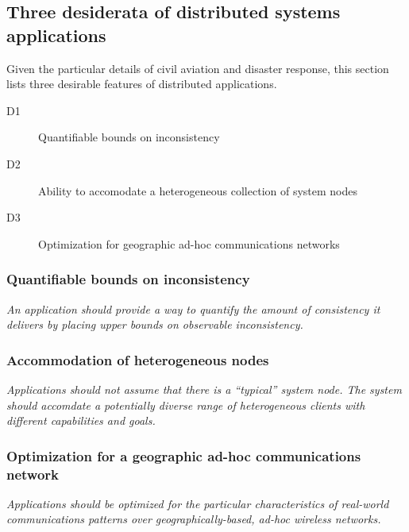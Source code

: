 \subsection{Three desiderata of distributed systems applications}

Given the particular details of civil aviation and disaster response,
this section lists three desirable features of distributed
applications.

\begin{description}
\item[D1] Quantifiable bounds on inconsistency
\item[D2] Ability to accomodate a heterogeneous collection of system nodes
\item[D3] Optimization for geographic ad-hoc communications networks
\end{description}

\subsubsection{Quantifiable bounds on inconsistency}

\emph{An application should provide a way to quantify the amount of
consistency it delivers by placing upper bounds on observable
inconsistency.}

\subsubsection{Accommodation of heterogeneous nodes}

\emph{Applications should not assume that there is a ``typical''
system node. The system should accomdate a potentially diverse range
of heterogeneous clients with different capabilities and goals.}

\subsubsection{Optimization for a geographic ad-hoc communications network}

\emph{Applications should be optimized for the particular
characteristics of real-world communications patterns over
geographically-based, ad-hoc wireless networks.}

